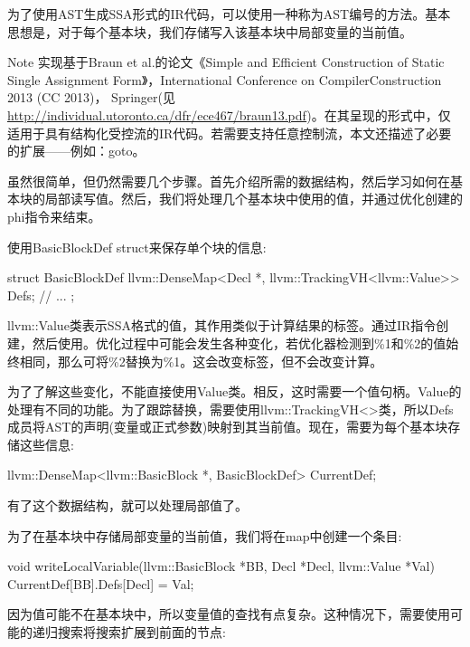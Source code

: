 
为了使用AST生成SSA形式的IR代码，可以使用一种称为AST编号的方法。基本思想是，对于每个基本块，我们存储写入该基本块中局部变量的当前值。

\begin{myNotic}{Note}
实现基于Braun et al.的论文《Simple and Efficient Construction of Static Single Assignment Form》，International Conference on CompilerConstruction 2013 (CC 2013)， Springer(见\url{http://individual.utoronto.ca/dfr/ece467/braun13.pdf})。在其呈现的形式中，仅适用于具有结构化受控流的IR代码。若需要支持任意控制流，本文还描述了必要的扩展——例如：goto。
\end{myNotic}

虽然很简单，但仍然需要几个步骤。首先介绍所需的数据结构，然后学习如何在基本块的局部读写值。然后，我们将处理几个基本块中使用的值，并通过优化创建的phi指令来结束。


使用BasicBlockDef struct来保存单个块的信息:

\begin{cpp}
struct BasicBlockDef {
    llvm::DenseMap<Decl *, llvm::TrackingVH<llvm::Value>> Defs;
    // ...
};
\end{cpp}

llvm::Value类表示SSA格式的值，其作用类似于计算结果的标签。通过IR指令创建，然后使用。优化过程中可能会发生各种变化，若优化器检测到\%1和\%2的值始终相同，那么可将\%2替换为\%1。这会改变标签，但不会改变计算。

为了了解这些变化，不能直接使用Value类。相反，这时需要一个值句柄。Value的处理有不同的功能。为了跟踪替换，需要使用llvm::TrackingVH<>类，所以Defs成员将AST的声明(变量或正式参数)映射到其当前值。现在，需要为每个基本块存储这些信息:

\begin{cpp}
llvm::DenseMap<llvm::BasicBlock *, BasicBlockDef> CurrentDef;
\end{cpp}

有了这个数据结构，就可以处理局部值了。


为了在基本块中存储局部变量的当前值，我们将在map中创建一个条目:

\begin{cpp}
void writeLocalVariable(llvm::BasicBlock *BB, Decl *Decl,
                        llvm::Value *Val) {
    CurrentDef[BB].Defs[Decl] = Val;
}
\end{cpp}

因为值可能不在基本块中，所以变量值的查找有点复杂。这种情况下，需要使用可能的递归搜索将搜索扩展到前面的节点:

